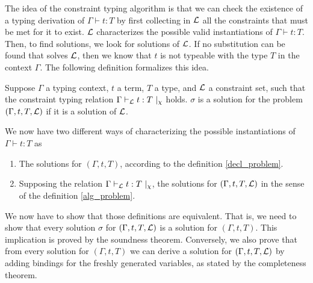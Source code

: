 The idea of the constraint typing algorithm is that we can check the existence of a typing derivation of $\Gamma \vdash t : T$ by first
collecting in $\mathcal{L}$ all the constraints that must be met for it to exist. $\mathcal{L}$ characterizes the possible valid instantiations of
$\Gamma \vdash t : T$. Then, to find solutions, we look for solutions of $\mathcal{L}$. If no substitution can be found that solves $\mathcal{L}$,
then we know that $t$ is not typeable with the type $T$ in the context $\Gamma$. The following definition formalizes this idea.

\begin{defn}
	\label{alg_problem}
	Suppose $\Gamma$ a typing context, $t$ a term, $T$ a type, and $\mathcal{L}$ a constraint set, such that the constraint typing relation
	$\Gamma \vdash_{\mathcal{L}} t : T ~|_\chi$ holds.
	$\sigma$ is a solution for the problem 	$(\Gamma, t, T, \mathcal{L})$ if it is a solution of $\mathcal{L}$.
\end{defn}

We now have two different ways of characterizing the possible instantiations of $\Gamma \vdash t : T$ as
 	\begin{enumerate}
 		\item The solutions for $(\Gamma, t, T)$, according to the definition \ref{decl_problem}.
 		\item Supposing the relation $\Gamma \vdash_{\mathcal{L}} t : T ~|_\chi$, the solutions for $(\Gamma, t, T, \mathcal{L})$ in the sense of the definition
 			\ref{alg_problem}.
 	\end{enumerate}

We now have to show that those definitions are equivalent. That is, we need to show that every solution $\sigma$ for $(\Gamma, t, T, \mathcal{L})$
is a solution for $(\Gamma, t, T)$. This implication is proved by the soundness theorem. Conversely, we also prove that from every solution
for $(\Gamma, t, T)$ we can derive a solution for $(\Gamma, t, T, \mathcal{L})$ by adding bindings for the freshly generated variables, as stated
by the completeness theorem.

